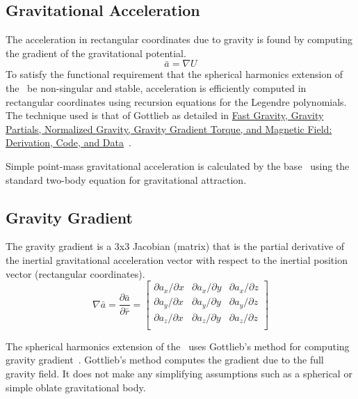 \subsection{Gravitational Acceleration}
The acceleration in rectangular coordinates due to gravity is found by computing
the gradient of the gravitational potential.
\begin{equation}
\bar{a} =  \nabla U
\end{equation}
To satisfy the functional requirement that the spherical harmonics extension of
the \ModelDesc\ be non-singular and stable, acceleration is efficiently computed
in rectangular coordinates using recursion equations for the Legendre polynomials.
The technique used is that of Gottlieb as detailed in
\hyperref{file:\JEODHOME/models/environment/gravity/docs/gottlieb_1993.pdf}{part1}{reqt}
{Fast Gravity, Gravity Partials, Normalized Gravity, Gravity Gradient 
Torque, and Magnetic Field: Derivation, Code, and Data}~\cite{JSC23762}.  

Simple point-mass gravitational acceleration is calculated by the base
\ModelDesc\ using the standard two-body equation for gravitational attraction.

\subsection{Gravity Gradient}
The gravity gradient is a 3x3 Jacobian (matrix) that is the partial derivative
of the inertial gravitational acceleration vector with respect to the inertial
position vector (rectangular coordinates).
\begin{equation}
\nabla \bar{a} = \frac{\partial\bar{a}}{\partial\bar{r}} =
\left[
\begin{array}{ccc}
\partial{a_x}/\partial{x} & \partial{a_x}/\partial{y} & \partial{a_x}/\partial{z} \\
\partial{a_y}/\partial{x} & \partial{a_y}/\partial{y} & \partial{a_y}/\partial{z} \\
\partial{a_z}/\partial{x} & \partial{a_z}/\partial{y} & \partial{a_z}/\partial{z} \\
\end{array}
\right]
\end{equation}

The spherical harmonics extension of the \ModelDesc\ uses Gottlieb's method for
computing gravity gradient~\cite{JSC23762}. Gottlieb's method computes the
gradient due to the full gravity field. It does not make any simplifying
assumptions such as a spherical or simple oblate gravitational body.

